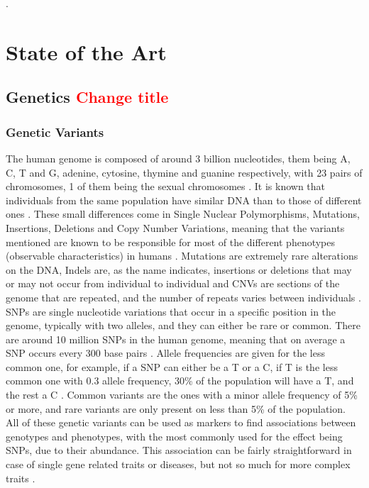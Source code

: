 .%

\chapter{State of the Art} \label{chapter:sota}

\section{Genetics \textcolor{red}{Change title}}

\subsection{Genetic Variants}
The human genome is composed of around 3 billion nucleotides, them being A, C, T and G, adenine, cytosine, thymine and guanine respectively, with 23 pairs of chromosomes, 1 of them being the sexual chromosomes \cite{zhang2012mining}. It is known that individuals from the same population have similar DNA than to those of different ones \cite{witherspoon2007genetic}. These small differences come in Single Nuclear Polymorphisms, Mutations, Insertions, Deletions and Copy Number Variations, meaning that the variants mentioned are known to be responsible for most of the different phenotypes (observable characteristics) in humans \cite{international2010integrating}. Mutations are extremely rare alterations on the DNA, Indels are, as the name indicates, insertions or deletions that may or may not occur from individual to individual and CNVs are sections of the genome that are repeated, and the number of repeats varies between individuals \cite{international2010integrating}.\\
SNPs are single nucleotide variations that occur in a specific position in the genome, typically with two alleles, and they can either be rare or common. There are around 10 million SNPs in the human genome, meaning that on average a SNP occurs every 300 base pairs  \cite{international2010integrating}. Allele frequencies are given for the less common one, for example, if a SNP can either be a T or a C, if T is the less common one with 0.3 allele frequency, 30\% of the population will have a T, and the rest a C \cite{bush2012genome}. Common variants are the ones with a minor allele frequency of 5\% or more, and rare variants are only present on less than 5\% of the population.\\ %
All of these genetic variants can be used as markers to find associations between genotypes and phenotypes, with the most commonly used for the effect being SNPs, due to their abundance. This association can be fairly straightforward in case of single gene related traits or diseases, but not so much for more complex traits \cite{zhang2012mining}.

